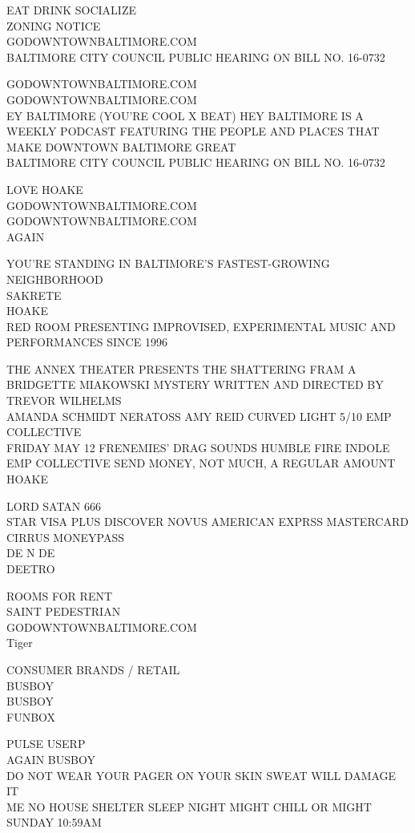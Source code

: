 \documentclass[10pt,letterpaper]{article}
\begin{document}
EAT DRINK SOCIALIZE\\
ZONING NOTICE\\
GODOWNTOWNBALTIMORE.COM\\
BALTIMORE CITY COUNCIL PUBLIC HEARING ON BILL NO. 16{-}0732

GODOWNTOWNBALTIMORE.COM\\
GODOWNTOWNBALTIMORE.COM\\
EY BALTIMORE (YOU'RE COOL X BEAT) HEY BALTIMORE IS A WEEKLY PODCAST FEATURING THE PEOPLE AND PLACES THAT MAKE DOWNTOWN BALTIMORE GREAT\\
BALTIMORE CITY COUNCIL PUBLIC HEARING ON BILL NO. 16{-}0732

LOVE HOAKE\\
GODOWNTOWNBALTIMORE.COM\\
GODOWNTOWNBALTIMORE.COM\\
AGAIN

YOU'RE STANDING IN BALTIMORE'S FASTEST{-}GROWING NEIGHBORHOOD\\
SAKRETE\\
HOAKE\\
RED ROOM PRESENTING IMPROVISED, EXPERIMENTAL MUSIC AND PERFORMANCES SINCE 1996

THE ANNEX THEATER PRESENTS THE SHATTERING FRAM A BRIDGETTE MIAKOWSKI MYSTERY WRITTEN AND DIRECTED BY TREVOR WILHELMS\\
AMANDA SCHMIDT NERATOSS AMY REID CURVED LIGHT 5/10 EMP COLLECTIVE\\
FRIDAY MAY 12 FRENEMIES' DRAG SOUNDS HUMBLE FIRE INDOLE EMP COLLECTIVE SEND MONEY, NOT MUCH, A REGULAR AMOUNT\\
HOAKE

LORD SATAN 666\\
STAR VISA PLUS DISCOVER NOVUS AMERICAN EXPRSS MASTERCARD CIRRUS MONEYPASS\\
DE N DE\\
DEETRO

ROOMS FOR RENT\\
SAINT PEDESTRIAN\\
GODOWNTOWNBALTIMORE.COM\\
Tiger

CONSUMER BRANDS / RETAIL\\
BUSBOY\\
BUSBOY\\
FUNBOX

PULSE USERP\\
AGAIN BUSBOY\\
DO NOT WEAR YOUR PAGER ON YOUR SKIN SWEAT WILL DAMAGE IT\\
ME NO HOUSE SHELTER SLEEP NIGHT MIGHT CHILL OR MIGHT SUNDAY 10:59AM
\end{document}
